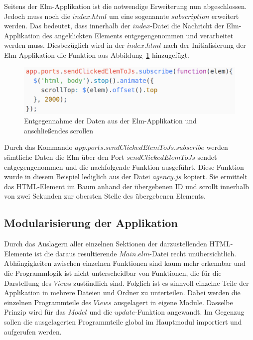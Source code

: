 Seitens der Elm-Applikation ist die notwendige Erweiterung nun abgeschlossen. Jedoch muss noch die $index.html$ um eine sogenannte $subscription$ erweitert werden. Das bedeutet, dass innerhalb der $index$-Datei die Nachricht der Elm-Applikation des angeklickten Elements entgegengenommen und verarbeitet werden muss. Diesbezüglich wird in der $index.html$ nach der Initialisierung der Elm-Applikation die Funktion aus Abbildung~\ref{fig:scrollTop} hinzugefügt.
\begin{figure}[hbt]
\centering
\includegraphics[scale=0.4]{img/scrollTop.png}
\caption{Entgegennahme der Daten aus der Elm-Applikation und anschließendes scrollen}\label{fig:scrollTop}
\end{figure}
Durch das Kommando $app.ports.sendClickedElemToJs.subscribe$ werden sämtliche Daten die Elm über den Port $sendClickedElemToJs$ sendet entgegengenommen und die nachfolgende Funktion ausgeführt. Diese Funktion wurde in diesem Beispiel lediglich aus der Datei $agency.js$ kopiert. Sie ermittelt das \ac{HTML}-Element im Baum anhand der übergebenen \ac{ID} und scrollt innerhalb von zwei Sekunden zur obersten Stelle des übergebenen Elements.

\subsection{Modularisierung der Applikation}
\label{sec:modularisierung-der-applikation}
Durch das Auslagern aller einzelnen Sektionen der darzustellenden \ac{HTML}-Elemente ist die daraus resultierende $Main.elm$-Datei recht unübersichtlich. Abhängigkeiten zwischen einzelnen Funktionen sind kaum mehr erkennbar und die Programmlogik ist nicht unterscheidbar von Funktionen, die für die Darstellung des $View$s zuständlich sind. Folglich ist es sinnvoll einzelne Teile der Applikation in mehrere Dateien und Ordner zu unterteilen. Dabei werden die einzelnen Programmteile des $Views$ ausgelagert in eigene Module. Dasselbe Prinzip wird für das $Model$ und die $update$-Funktion angewandt. Im Gegenzug sollen die ausgelagerten Programmteile global im Hauptmodul importiert und aufgerufen werden.

